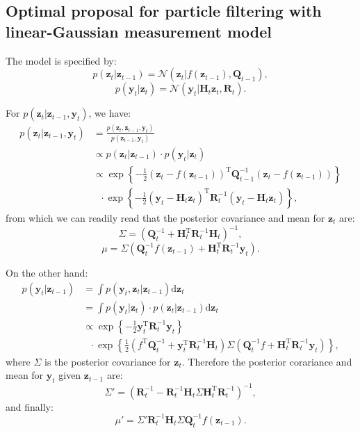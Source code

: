 \documentclass[UTF8]{ctexart}
\begin{document}
\subsection{Optimal proposal for particle filtering with linear-Gaussian measurement model}
The model is specified by:
$$p(\textbf{z}_{t}|\textbf{z}_{t-1})=\mathcal{N}(\textbf{z}_{t}|f(\textbf{z}_{t-1}),\textbf{Q}_{t-1}),$$
$$p(\textbf{y}_{t}|\textbf{z}_{t})=\mathcal{N}(\textbf{y}_{t}|\textbf{H}_{t}\textbf{z}_{t},\textbf{R}_{t}).$$

For $p(\textbf{z}_{t}|\textbf{z}_{t-1},\textbf{y}_{t})$, we have:
$$
\begin{aligned}
p(\textbf{z}_{t}|\textbf{z}_{t-1},\textbf{y}_{t})&=\frac{p(\textbf{z}_{t},\textbf{z}_{t-1},\textbf{y}_{t})}{p(\textbf{z}_{t-1},\textbf{y}_{t})}\\
&\propto p(\textbf{z}_{t}|\textbf{z}_{t-1})\cdot p(\textbf{y}_{t}|\textbf{z}_{t})\\
&\propto \exp\left\{-\frac{1}{2}(\textbf{z}_{t}-f(\textbf{z}_{t-1}))^{\text{T}}\textbf{Q}_{t-1}^{-1}(\textbf{z}_{t}-f(\textbf{z}_{t-1}))\right\}\\
&\ \ \ \cdot\exp\left\{-\frac{1}{2}(\textbf{y}_{t}-\textbf{H}_{t}\textbf{z}_{t})^{\text{T}}\textbf{R}_{t}^{-1}(\textbf{y}_{t}-\textbf{H}_{t}\textbf{z}_{t}) \right\},
\end{aligned}
$$
from which we can readily read that the posterior covariance and mean for $\textbf{z}_{t}$ are:
$$\Sigma=\left(\textbf{Q}_{t}^{-1}+\textbf{H}_{t}^{\text{T}}\textbf{R}_{t}^{-1}\textbf{H}_{t} \right)^{-1},$$
$$\mu=\Sigma\left(\textbf{Q}_{t}^{-1}f(\textbf{z}_{t-1})+\textbf{H}_{t}^{\text{T}}\textbf{R}_{t}^{-1}\textbf{y}_{t} \right).$$

On the other hand:
$$
\begin{aligned}
p(\textbf{y}_{t}|\textbf{z}_{t-1})&=\int p(\textbf{y}_{t},\textbf{z}_{t}|\textbf{z}_{t-1})\text{d}\textbf{z}_{t}\\
&=\int p(\textbf{y}_{t}|\textbf{z}_{t})\cdot p(\textbf{z}_{t}|\textbf{z}_{t-1})\text{d} \textbf{z}_{t}\\
&\propto\exp\left\{-\frac{1}{2}\textbf{y}^{\text{T}}_{t}\textbf{R}_{t}^{-1}\textbf{y}_{t} \right\}\\
&\ \ \ \cdot \exp\left\{\frac{1}{2}(f^{\text{T}}\textbf{Q}_{t}^{-1}+\textbf{y}_{t}^{\text{T}}\textbf{R}^{-1}_{t}\textbf{H}_{t})\Sigma (\textbf{Q}^{-1}_{t}f+\textbf{H}^{\text{T}}_{t}\textbf{R}^{-1}_{t}\textbf{y}_{t}) \right\},
\end{aligned}
$$
where $\Sigma$ is the posterior covariance for $\textbf{z}_{t}$.
Therefore the posterior corariance and mean for $\textbf{y}_{t}$ given $\textbf{z}_{t-1}$ are:
$$\Sigma'=\left(\textbf{R}_{t}^{-1}-\textbf{R}_{t}^{-1}\textbf{H}_{t}\Sigma\textbf{H}^{\text{T}}_{t}\textbf{R}_{t}^{-1} \right)^{-1},$$
and finally:
$$\mu'=\Sigma'\textbf{R}_{t}^{-1}\textbf{H}_{t}\Sigma\textbf{Q}_{t}^{-1}f(\textbf{z}_{t-1}).$$
\end{document}
